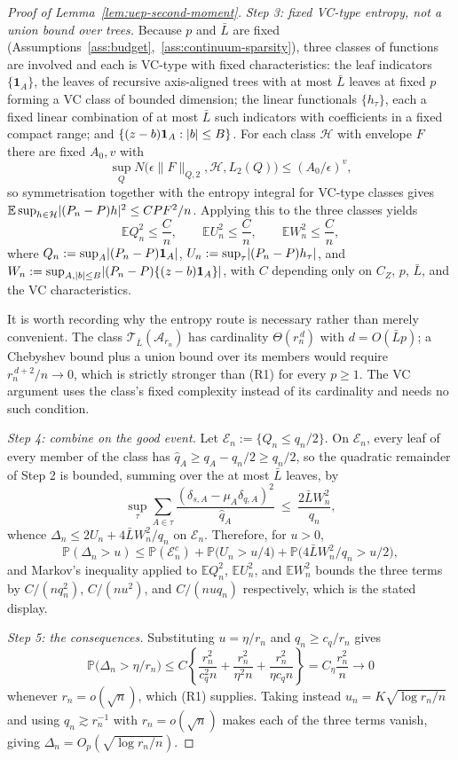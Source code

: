 \documentclass[11pt]{article}
\theoremstyle{plain}
\theoremstyle{definition}
\theoremstyle{remark}
\newcommand{\E}{\mathbb{E}}
\newcommand{\PP}{\mathbb{P}}
\newcommand{\cA}{\mathcal{A}}
\newcommand{\cT}{\mathcal{T}}
\DeclarePairedDelimiter{\abs}{\lvert}{\rvert}
\begin{document}
\begin{proof}[Proof of Lemma~\ref{lem:uep-second-moment}]
\emph{Step 3: fixed VC-type entropy, not a union bound over trees.}
Because \(p\) and \(\bar L\) are fixed
(Assumptions~\ref{ass:budget},~\ref{ass:continuum-sparsity}), three classes of
functions are involved and each is VC-type with fixed characteristics: the
leaf indicators \(\{\mathbf 1_A\}\), the leaves of recursive axis-aligned
trees with at most \(\bar L\) leaves at fixed \(p\) forming a VC class of
bounded dimension; the linear functionals \(\{h_\tau\}\), each a fixed
linear combination of at most \(\bar L\) such indicators with coefficients in
a fixed compact range; and \(\{(z-b)\mathbf 1_A:\abs b\le B\}\). For each
class \(\mathcal{H}\) with envelope \(F\) there are fixed \(A_0,v\) with
\[
  \sup_Q N\bigl(\epsilon\|F\|_{Q,2},\mathcal{H},L_2(Q)\bigr)
  \le(A_0/\epsilon)^v ,
\]
so symmetrisation together with the entropy integral for VC-type classes
gives \(\E\sup_{h\in\mathcal{H}}\abs{(P_n-P)h}^2\le CPF^2/n\). Applying this to the
three classes yields
\[
  \E Q_n^2\le\frac Cn,
  \qquad
  \E U_n^2\le\frac Cn,
  \qquad
  \E W_n^2\le\frac Cn,
\]
where \(Q_n:=\sup_A\abs{(P_n-P)\mathbf 1_A}\),
\(U_n:=\sup_\tau\abs{(P_n-P)h_\tau}\), and
\(W_n:=\sup_{A,\abs b\le B}\abs{(P_n-P)\{(z-b)\mathbf 1_A\}}\), with \(C\)
depending only on \(C_Z\), \(p\), \(\bar L\), and the VC characteristics.

It is worth recording why the entropy route is necessary rather than merely
convenient. The class \(\cT_{\bar L}(\cA_{r_n})\) has cardinality
\(\Theta(r_n^{\,d})\) with \(d=O(\bar Lp)\); a Chebyshev bound plus a union
bound over its members would require \(r_n^{\,d+2}/n\to0\), which is strictly
stronger than (R1) for every \(p\ge1\). The VC argument uses the class's fixed
complexity instead of its cardinality and needs no such condition.

\emph{Step 4: combine on the good event.}
Let \(\mathcal{E}_n:=\{Q_n\le q_n/2\}\). On \(\mathcal{E}_n\), every leaf of every member of
the class has \(\hat q_A\ge q_A-q_n/2\ge q_n/2\), so the quadratic remainder
of Step 2 is bounded, summing over the at most \(\bar L\) leaves, by
\[
  \sup_\tau\sum_{A\in\tau}
  \frac{(\delta_{s,A}-\mu_A\delta_{q,A})^2}{\hat q_A}
  \ \le\
  \frac{2\bar LW_n^2}{q_n},
\]
whence \(\Delta_n\le2U_n+4\bar LW_n^2/q_n\) on \(\mathcal{E}_n\). Therefore, for
\(u>0\),
\[
  \PP(\Delta_n>u)
  \le
  \PP(\mathcal{E}_n^c)
  +\PP\bigl(U_n>u/4\bigr)
  +\PP\bigl(4\bar LW_n^2/q_n>u/2\bigr),
\]
and Markov's inequality applied to \(\E Q_n^2\), \(\E U_n^2\), and
\(\E W_n^2\) bounds the three terms by \(C/(nq_n^2)\), \(C/(nu^2)\), and
\(C/(nuq_n)\) respectively, which is the stated display.

\emph{Step 5: the consequences.}
Substituting \(u=\eta/r_n\) and \(q_n\ge c_q/r_n\) gives
\[
  \PP\bigl(\Delta_n>\eta/r_n\bigr)
  \le
  C\left\{\frac{r_n^2}{c_q^2n}+\frac{r_n^2}{\eta^2n}
    +\frac{r_n^2}{\eta c_qn}\right\}
  =
  C_\eta\frac{r_n^2}{n}
  \longrightarrow0
\]
whenever \(r_n=o(\sqrt n)\), which (R1) supplies. Taking instead
\(u_n=K\sqrt{\log r_n/n}\) and using \(q_n\gtrsim r_n^{-1}\) with
\(r_n=o(\sqrt n)\) makes each of the three terms vanish, giving
\(\Delta_n=O_p(\sqrt{\log r_n/n})\).
\end{proof}
\end{document}

